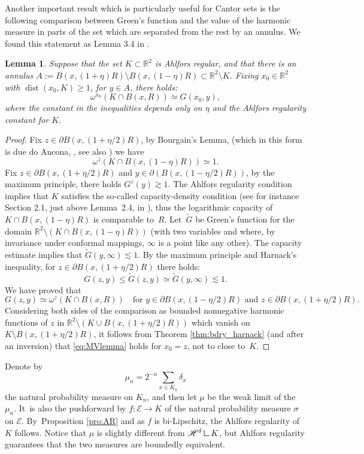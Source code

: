 \documentclass[JEP,XML,SOM,Unicode,published]{cedram}
\let\backslash\setminus
\let\sm\setminus
\let\wt\widetilde
\numberwithin{equation}{section}
\theoremstyle{plain}
\newtheorem{lem}{Lemma}[section]
\theoremstyle{definition}
\newcommand{\R}{\mathbb{R}}
\let\sm\setminus
\DeclareMathOperator{\dist}{dist}
\newcommand{\R}{\mathbb{R}}
\renewcommand{\H}{\mathscr{H}}
\DeclareMathOperator{\dist}{dist}
\newcommand{\cE}{{\mathcal E}}
\newcommand{\mres}{\mathbin{\vrule height 1.6ex depth 0pt width
0.13ex\vrule height 0.13ex depth 0pt width 1.3ex}}
\begin{document}
Another important result which is particularly useful for Cantor sets is the following comparison between Green's function and the value of the harmonic measure in parts of the set which are separated from the rest by an annulus. We found this statement as Lemma 3.4 in \cite{MakarovVolberg1986}.
\begin{lem}\label{lem:MV}
Suppose that the set $K\subset \R^2$ is Ahlfors regular, and that there is an annulus $ A:= B(x,(1+\eta) R)\backslash B(x,(1-\eta)R)\subset \R^2\backslash K$. Fixing $x_0\in \R^2$ with $\dist(x_0,K)\ge 1$, for $y\in A$, there holds:
\begin{equation}\label{eq:MVlemma}
\omega^{x_0}(K\cap B(x,R)) \simeq G(x_0, y),
\end{equation}
where the constant in the inequalities
depends only on $\eta$ and the Ahlfors regularity constant for
$K$.
\end{lem}
\begin{proof}
Fix $z\in \partial B(x,(1+\eta/2)R)$, by Bourgain's Lemma, (which in this form is due do Ancona, \cite[Lem.\,3]{Ancona1986Strong}, see also \cite[Lem.\,3.4]{AHMMMTV2016GAFA}) we have
\[
\omega^{z}(K\cap B(x,(1-\eta) R)) \simeq 1.
\]
Fix $z\in \partial B(x,(1+\eta/2)R)$ and $y\in \partial(B(x,(1-\eta/2)R))$, by the maximum principle, there holds $G^z(y)\gtrsim 1$. The Ahlfors regularity condition implies that $K$ satisfies the so-called capacity-density condition
(see for instance Section 2.1, just above Lemma~2.4, in \cite{Tolsa2023ADreg}),
thus the logarithmic capacity of $K\cap B(x,(1-\eta)R)$ is comparable to~$R$.
Let~$\wt G$ be Green's function for the domain $\R^2\sm (K\cap B(x,(1-\eta)R))$ (with two variables and where, by invariance
under conformal mappings, $\infty$ is a point like any other). The capacity estimate implies that
$\wt G (y,\infty) \lesssim 1$.
By the maximum principle and Harnack's inequality, for $z\in \partial B(x,(1+\eta/2)R)$ there holds:
\[
G(z,y)\le \wt G(z,y) \simeq \wt G(y, \infty) \lesssim 1.
\]
We have proved that
\[
G(z,y)\simeq \omega^{z}(K\cap B(x,R))\quad\text{for $y \in \partial B(x,(1-\eta/2)R)$ and $z\in \partial B(x,(1+\eta/2)R)$}.
\]
Considering both sides of the comparison as bounded nonnegative harmonic functions of $z$ in $\R^2\sm (K\cup B(x,(1+\eta/2)R))$ which vanish on $K\sm B(x,(1+\eta/2)R)$,
it follows from Theorem \ref{thm:bdry_harnack} (and after an inversion) that
\eqref{eq:MVlemma} holds for $x_0=z$, not to close to~$K$.
\end{proof}

Denote by
\begin{equation} \label{3b1}
\mu_n = 2^{-n} \sum_{x \in K_n} \delta_x
\end{equation}
the natural probability measure on $K_n$, and then let $\mu$ be the weak limit of the $\mu_n$.
It~is also the pushforward by $f : \cE \to K$ of the natural probability measure $\sigma$ on $\cE$. By~Proposition \ref{pro:AR} and as $f$ is bi-Lipschitz, the Ahlfors regularity of $K$ follows.
Notice that $\mu$ is slightly different from $\H^\delta \mres{K}$, but Ahlfors regularity guarantees that the two measures are boundedly equivalent.
\end{document}
